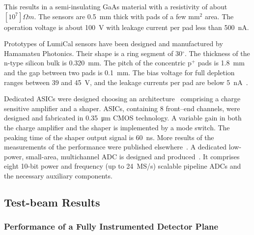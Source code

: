 This results in a semi-insulating GaAs material with a resistivity of about $[10^7]{\Omega m}$.
The sensors are \SI{0.5}{mm} thick with pads of a few mm$^2$ area. The operation voltage is about \SI{100}{V} with
leakage current per pad less than \SI{500}{nA}.

Prototypes of LumiCal sensors have been designed
and manufactured by Hamamatsu
Photonics.
Their shape is a ring segment of 30$^\circ$.
The thickness of the n-type silicon bulk is \SI{0.320}{mm}.
The pitch of the concentric p$^+$ pads is \SI{1.8}{mm} and
the gap between two pads is \SI{0.1}{mm}.
The bias voltage for full depletion ranges between 39 and \SI{45}{V},
and the leakage currents per pad are below \SI{5}{nA}~\cite{eudet2009}.

Dedicated ASICs were designed choosing
an
architecture~\cite{Boie1982365,Gatti:1986qq}
comprising a charge sensitive amplifier and a shaper.
ASICs, containing 8 front--end channels, were designed and fabricated in \SI{0.35}{\micro\meter} CMOS technology.
A variable gain in both the charge amplifier and
the shaper is implemented by a mode switch. The peaking time of the shaper output signal is \SI{60}{ns}.
More results of the measurements of the performance were published elsewhere~\cite{4600902}.
A dedicated low-power, small-area, multichannel ADC is designed and produced~\cite{6156491}.
It comprises eight 10-bit power and frequency (up to \SI{24}{MS/s}) scalable pipeline ADCs and the necessary
auxiliary components.


\subsection{Test-beam Results}

\subsubsection{Performance of a Fully Instrumented  Detector Plane}

